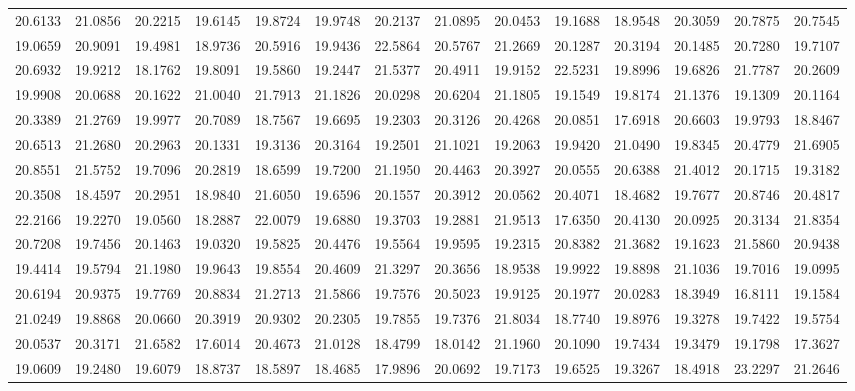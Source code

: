 \documentclass[12pt]{article}\usepackage[]{graphicx}\usepackage[]{color}
\begin{document}
\begin{landscape}
\begin{longtable}[t]{rrrrrrrrrrrrrr}
20.6133 & 21.0856 & 20.2215 & 19.6145 & 19.8724 & 19.9748 & 20.2137 & 21.0895 & 20.0453 & 19.1688 & 18.9548 & 20.3059 & 20.7875 & 20.7545\\
19.0659 & 20.9091 & 19.4981 & 18.9736 & 20.5916 & 19.9436 & 22.5864 & 20.5767 & 21.2669 & 20.1287 & 20.3194 & 20.1485 & 20.7280 & 19.7107\\
20.6932 & 19.9212 & 18.1762 & 19.8091 & 19.5860 & 19.2447 & 21.5377 & 20.4911 & 19.9152 & 22.5231 & 19.8996 & 19.6826 & 21.7787 & 20.2609\\
19.9908 & 20.0688 & 20.1622 & 21.0040 & 21.7913 & 21.1826 & 20.0298 & 20.6204 & 21.1805 & 19.1549 & 19.8174 & 21.1376 & 19.1309 & 20.1164\\
20.3389 & 21.2769 & 19.9977 & 20.7089 & 18.7567 & 19.6695 & 19.2303 & 20.3126 & 20.4268 & 20.0851 & 17.6918 & 20.6603 & 19.9793 & 18.8467\\
20.6513 & 21.2680 & 20.2963 & 20.1331 & 19.3136 & 20.3164 & 19.2501 & 21.1021 & 19.2063 & 19.9420 & 21.0490 & 19.8345 & 20.4779 & 21.6905\\
20.8551 & 21.5752 & 19.7096 & 20.2819 & 18.6599 & 19.7200 & 21.1950 & 20.4463 & 20.3927 & 20.0555 & 20.6388 & 21.4012 & 20.1715 & 19.3182\\
20.3508 & 18.4597 & 20.2951 & 18.9840 & 21.6050 & 19.6596 & 20.1557 & 20.3912 & 20.0562 & 20.4071 & 18.4682 & 19.7677 & 20.8746 & 20.4817\\
22.2166 & 19.2270 & 19.0560 & 18.2887 & 22.0079 & 19.6880 & 19.3703 & 19.2881 & 21.9513 & 17.6350 & 20.4130 & 20.0925 & 20.3134 & 21.8354\\
20.7208 & 19.7456 & 20.1463 & 19.0320 & 19.5825 & 20.4476 & 19.5564 & 19.9595 & 19.2315 & 20.8382 & 21.3682 & 19.1623 & 21.5860 & 20.9438\\
19.4414 & 19.5794 & 21.1980 & 19.9643 & 19.8554 & 20.4609 & 21.3297 & 20.3656 & 18.9538 & 19.9922 & 19.8898 & 21.1036 & 19.7016 & 19.0995\\
20.6194 & 20.9375 & 19.7769 & 20.8834 & 21.2713 & 21.5866 & 19.7576 & 20.5023 & 19.9125 & 20.1977 & 20.0283 & 18.3949 & 16.8111 & 19.1584\\
21.0249 & 19.8868 & 20.0660 & 20.3919 & 20.9302 & 20.2305 & 19.7855 & 19.7376 & 21.8034 & 18.7740 & 19.8976 & 19.3278 & 19.7422 & 19.5754\\
20.0537 & 20.3171 & 21.6582 & 17.6014 & 20.4673 & 21.0128 & 18.4799 & 18.0142 & 21.1960 & 20.1090 & 19.7434 & 19.3479 & 19.1798 & 17.3627\\
19.0609 & 19.2480 & 19.6079 & 18.8737 & 18.5897 & 18.4685 & 17.9896 & 20.0692 & 19.7173 & 19.6525 & 19.3267 & 18.4918 & 23.2297 & 21.2646\\

\end{longtable}
\end{landscape}
\end{document}
